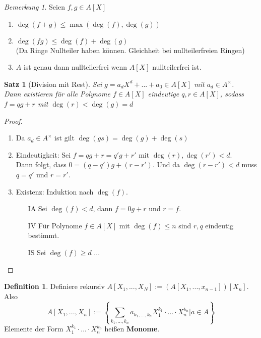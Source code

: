 \documentclass[10pt,a4paper]{article}
\newcounter{thm}[section]
\theoremstyle{definition}
\newtheorem{definition}[thm]{Definition}
\theoremstyle{plain}
\newtheorem{satz}[thm]{Satz}
\theoremstyle{remark}
\newtheorem{bem}[thm]{Bemerkung}
\begin{document}
\begin{bem}
	Seien $f,g\in A[X]$
	\begin{enumerate}
		\item $\deg(f+g)\leq\max(\deg(f),\deg(g))$
		\item $\deg(fg)\leq\deg(f)+\deg(g)$\\
		(Da Ringe Nullteiler haben können. Gleichheit bei nullteilerfreien Ringen)
		\item $A$ ist genau dann nullteilerfrei wenn $A[X]$ nullteilerfrei ist.
	\end{enumerate}
\end{bem}

\begin{satz}[Division mit Rest]
	Sei $g=a_dX^d+...+a_0\in A[X]$ mit $a_d\in A^\times$.\\
	Dann existieren für alle Polynome $f\in A[X]$ eindeutige $q,r\in A[X]$, sodass $f=qg+r$ mit $\deg(r)<\deg(g)=d$
\end{satz}
\begin{proof}
	\begin{enumerate}
		\item Da $a_d\in A^\times$ ist gilt $\deg(gs)=\deg(g)+\deg(s)$
		\item Eindeutigkeit: Sei $f=qg+r=q'g+r'$ mit $\deg(r),\deg(r')<d$.\\
		Dann folgt, dass $0=(q-q')g+(r-r')$. Und da $\deg(r-r')<d$ muss $q=q'$ und $r=r'$.
		\item Existenz: Induktion nach $\deg(f)$.\\
		\begin{itemize}
			\item [IA] Sei $\deg(f)<d$, dann $f=0g+r$ und $r=f$.
			\item [IV] Für Polynome $f\in A[X]$ mit $\deg(f)\leq n$ sind $r,q$ eindeutig bestimmt.
			\item [IS] Sei $\deg(f)\geq d$
			...
		\end{itemize}
		
	\end{enumerate}
\end{proof}

\begin{definition}
	Definiere rekursiv $A[X_1,...,X_N]:=(A[X_1,...,x_{n-1}])[X_n]$. Also\\
	\[A[X_1,...,X_n]:=\left\{\sum_{k_1,...,k_n}a_{k_1,...,k_n}X_1^{k_1}\cdot...\cdot X_n^{k_n}\vert a\in A\right\}\]
	Elemente der Form $X_1^{k_1}\cdot...\cdot X_n^{k_n}$ heißen \textbf{Monome}.
\end{definition}
\end{document}
